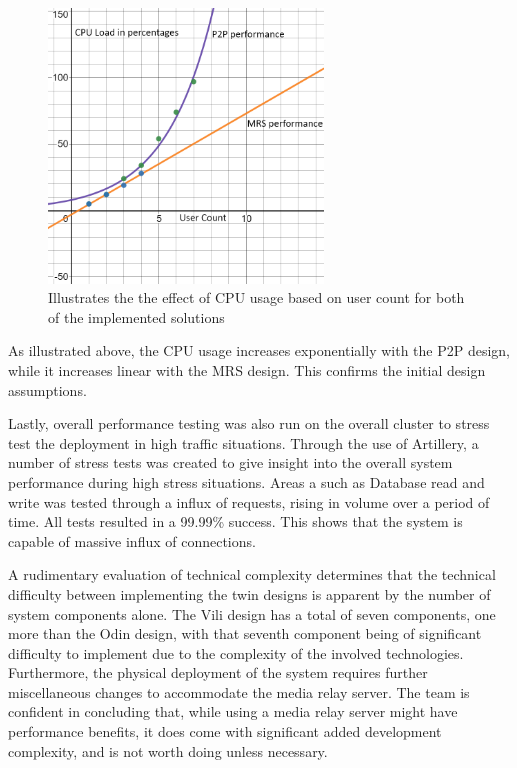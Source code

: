 \begin{figure}[]
    \centering
    \includegraphics[width=0.65\textwidth]{Pictures/Performance Graph.png}
    \caption{Illustrates the the effect of CPU usage based on user count for both of the implemented solutions}
    \label{fig:performance-graph}
\end{figure}

\newpage

As illustrated above, the CPU usage increases exponentially with the P2P design, while it increases linear with the MRS design. This confirms the initial design assumptions.

Lastly, overall performance testing was also run on the overall cluster to stress test the deployment in high traffic situations. Through the use of Artillery, a number of stress tests was created to give insight into the overall system performance during high stress situations. Areas a such as Database read and write was tested through a influx of requests, rising in volume over a period of time. All tests resulted in a 99.99\% success. This shows that the system is capable of massive influx of connections. 

A rudimentary evaluation of technical complexity determines that the technical difficulty between implementing the twin designs is apparent by the number of system components alone. The Vili design has a total of seven components, one more than the Odin design, with that seventh component being of significant difficulty to implement due to the complexity of the involved technologies. Furthermore, the physical deployment of the system requires further miscellaneous changes to accommodate the media relay server. The team is confident in concluding that, while using a media relay server might have performance benefits, it does come with significant added development complexity, and is not worth doing unless necessary.

